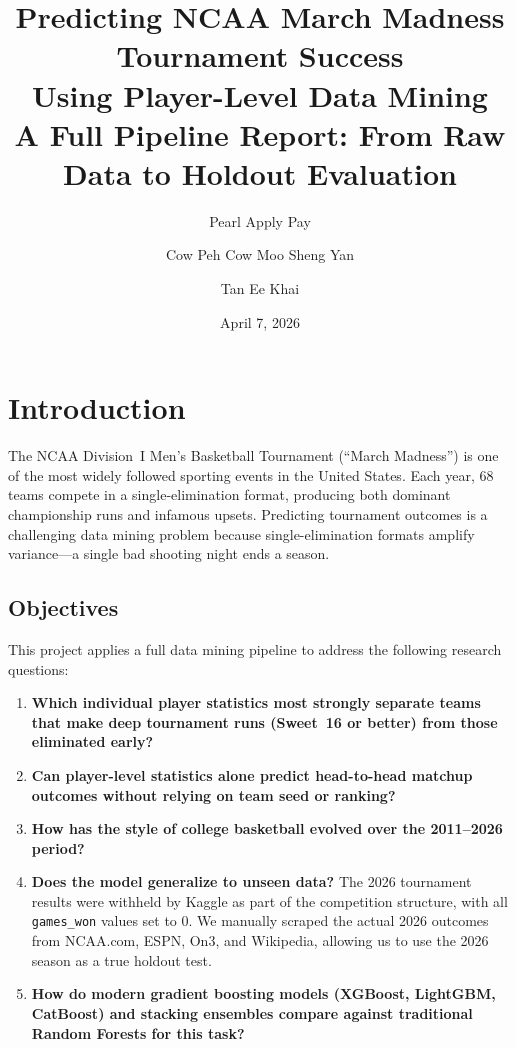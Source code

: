 \documentclass[12pt, a4paper]{article}
\title{
    \textbf{Predicting NCAA March Madness Tournament Success\\
    Using Player-Level Data Mining}\\[6pt]
    \large A Full Pipeline Report: From Raw Data to Holdout Evaluation
}
\author{
    Pearl Apply Pay \and Cow Peh Cow Moo Sheng Yan \and Tan Ee Khai
}
\date{April 7, 2026}
\begin{document}
\maketitle
\thispagestyle{empty}

\tableofcontents
\newpage

\section{Introduction}
\label{sec:intro}

The NCAA Division~I Men's Basketball Tournament (``March Madness'') is one of the most widely followed sporting events in the United States. Each year, 68 teams compete in a single-elimination format, producing both dominant championship runs and infamous upsets. Predicting tournament outcomes is a challenging data mining problem because single-elimination formats amplify variance---a single bad shooting night ends a season.

\subsection{Objectives}

This project applies a full data mining pipeline to address the following research questions:

\begin{enumerate}
    \item \textbf{Which individual player statistics most strongly separate teams that make deep tournament runs (Sweet~16 or better) from those eliminated early?}
    \item \textbf{Can player-level statistics alone predict head-to-head matchup outcomes without relying on team seed or ranking?}
    \item \textbf{How has the style of college basketball evolved over the 2011--2026 period?}
    \item \textbf{Does the model generalize to unseen data?} The 2026 tournament results were withheld by Kaggle as part of the competition structure, with all \texttt{games\_won} values set to 0. We manually scraped the actual 2026 outcomes from NCAA.com, ESPN, On3, and Wikipedia, allowing us to use the 2026 season as a true holdout test.
    \item \textbf{How do modern gradient boosting models (XGBoost, LightGBM, CatBoost) and stacking ensembles compare against traditional Random Forests for this task?}
\end{enumerate}
\end{document}
